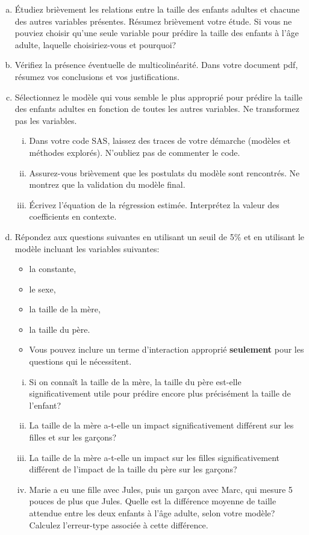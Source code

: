 \documentclass[letter, 11pt]{article}
\begin{document}
\begin{enumerate}[(a)]
\item Étudiez brièvement les relations entre la taille des enfants adultes et chacune des autres variables présentes. Résumez brièvement votre étude. Si vous ne pouviez choisir qu'une seule variable pour prédire la taille des enfants à l'âge adulte, laquelle choisiriez-vous et pourquoi?
%
\item Vérifiez la présence éventuelle de multicolinéarité. Dans votre document pdf, résumez vos conclusions et vos justifications.  
%
\item Sélectionnez le modèle qui vous semble le plus approprié pour prédire la taille des enfants adultes en fonction de toutes les autres variables. Ne transformez pas les variables.
    \begin{enumerate}[(i)]
    \item Dans votre code SAS, laissez des traces de votre démarche (modèles et méthodes explorés). N'oubliez pas de commenter le code.
    \item Assurez-vous brièvement que les postulats du modèle sont rencontrés. Ne montrez que la validation du modèle final.
    \item  Écrivez l'équation de la régression estimée. Interprétez la valeur des coefficients en contexte.
    \end{enumerate}
\item  Répondez aux questions suivantes en utilisant un seuil de 5\% et en utilisant le modèle incluant les variables suivantes:
\begin{itemize}
    \item la constante,
    \item le sexe, 
    \item la taille de la mère,
    \item la taille du père.
    \item Vous pouvez inclure un terme d'interaction approprié {\bf seulement} pour les questions qui le nécessitent.
\end{itemize}
    \begin{enumerate}[(i)]
    \item Si on connaît la taille de la mère, la taille du père est-elle significativement utile pour prédire encore plus précisément la taille de l'enfant? %
    \item La taille de la mère a-t-elle un impact significativement différent sur les filles et sur les garçons? %
    \item La taille de la mère a-t-elle un impact  sur les filles significativement différent de l'impact de la taille du père sur les garçons? %
    \item Marie a eu une fille avec Jules, puis un garçon avec Marc, qui mesure 5 pouces de plus que Jules. Quelle est la différence moyenne de taille attendue entre les deux enfants à l'âge adulte, selon votre modèle? Calculez l'erreur-type associée à cette différence.
    \end{enumerate}
    

\end{enumerate}
\end{document}
